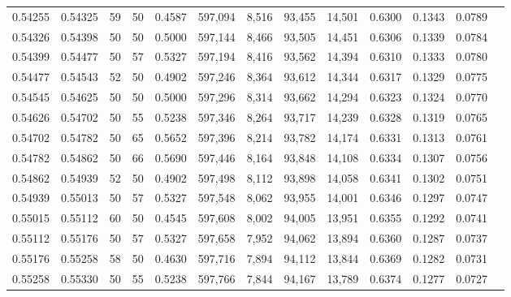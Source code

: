 \begin{tabular}{rrrrrrrrrrrrr}
0.54255 & 0.54325 &    59 &  50 &                                     0.4587 & 597,094 &   8,516 &  93,455 &  14,501 & 0.6300 & 0.1343 & 0.0789 \\
0.54326 & 0.54398 &    50 &  50 &                                     0.5000 & 597,144 &   8,466 &  93,505 &  14,451 & 0.6306 & 0.1339 & 0.0784 \\
0.54399 & 0.54477 &    50 &  57 &                                     0.5327 & 597,194 &   8,416 &  93,562 &  14,394 & 0.6310 & 0.1333 & 0.0780 \\
0.54477 & 0.54543 &    52 &  50 &                                     0.4902 & 597,246 &   8,364 &  93,612 &  14,344 & 0.6317 & 0.1329 & 0.0775 \\
0.54545 & 0.54625 &    50 &  50 &                                     0.5000 & 597,296 &   8,314 &  93,662 &  14,294 & 0.6323 & 0.1324 & 0.0770 \\
0.54626 & 0.54702 &    50 &  55 &                                     0.5238 & 597,346 &   8,264 &  93,717 &  14,239 & 0.6328 & 0.1319 & 0.0765 \\
0.54702 & 0.54782 &    50 &  65 &                                     0.5652 & 597,396 &   8,214 &  93,782 &  14,174 & 0.6331 & 0.1313 & 0.0761 \\
0.54782 & 0.54862 &    50 &  66 &                                     0.5690 & 597,446 &   8,164 &  93,848 &  14,108 & 0.6334 & 0.1307 & 0.0756 \\
0.54862 & 0.54939 &    52 &  50 &                                     0.4902 & 597,498 &   8,112 &  93,898 &  14,058 & 0.6341 & 0.1302 & 0.0751 \\
0.54939 & 0.55013 &    50 &  57 &                                     0.5327 & 597,548 &   8,062 &  93,955 &  14,001 & 0.6346 & 0.1297 & 0.0747 \\
0.55015 & 0.55112 &    60 &  50 &                                     0.4545 & 597,608 &   8,002 &  94,005 &  13,951 & 0.6355 & 0.1292 & 0.0741 \\
0.55112 & 0.55176 &    50 &  57 &                                     0.5327 & 597,658 &   7,952 &  94,062 &  13,894 & 0.6360 & 0.1287 & 0.0737 \\
0.55176 & 0.55258 &    58 &  50 &                                     0.4630 & 597,716 &   7,894 &  94,112 &  13,844 & 0.6369 & 0.1282 & 0.0731 \\
0.55258 & 0.55330 &    50 &  55 &                                     0.5238 & 597,766 &   7,844 &  94,167 &  13,789 & 0.6374 & 0.1277 & 0.0727 \\

\end{tabular}
